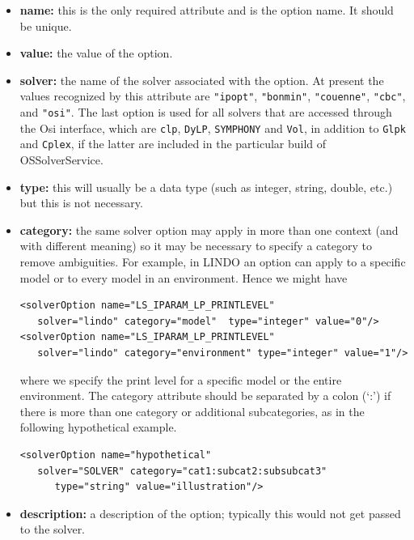 \begin{itemize}

\item {\bf name:} this is the only required attribute and is the option name. It should be unique.

\item {\bf value:}  the value of the option.

\item {\bf solver:} the name of the solver associated with the option. 
At present the values recognized by this attribute are 
{\tt "ipopt"}, 
{\tt "bonmin"}, 
{\tt "couenne"}, 
{\tt "cbc"}, 
and {\tt "osi"}. 
The last option is used for all solvers that are accessed through the 
Osi interface, which are 
{\tt clp},
 {\tt DyLP}, 
{\tt SYMPHONY} and 
{\tt Vol}, in addition to 
{\tt Glpk} and 
{\tt Cplex}, 
if the latter are included in the particular build of OSSolverService.

\item {\bf type:} this will usually be a data type (such as integer, string, double, etc.) but this is not necessary.

\item {\bf category:} the same solver option may apply in more than one context (and with different meaning) so it may be necessary
to specify a category to remove ambiguities. For example, in LINDO an option can apply to a specific model or to every model in an environment. 
Hence we might have

\begin{verbatim}
<solverOption name="LS_IPARAM_LP_PRINTLEVEL" 
   solver="lindo" category="model"  type="integer" value="0"/>
<solverOption name="LS_IPARAM_LP_PRINTLEVEL" 
   solver="lindo" category="environment" type="integer" value="1"/>
\end{verbatim}
where we specify the print level for a specific model or the entire environment.   The category attribute should be 
separated by a colon (`:') if there is more than one  category or  additional subcategories, 
as in the following hypothetical example.
\begin{verbatim}
<solverOption name="hypothetical" 
   solver="SOLVER" category="cat1:subcat2:subsubcat3" 
      type="string" value="illustration"/>
\end{verbatim}

\item {\bf description:} a description of the option; typically this would not get passed to the solver.

\end{itemize}

